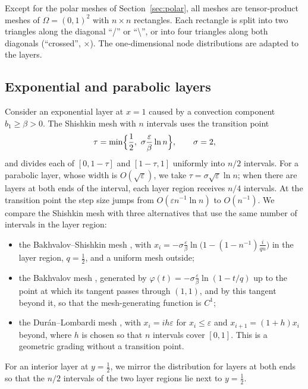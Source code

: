 \documentclass[11pt,a4paper]{article}
\newcommand{\eps}{\varepsilon}
\theoremstyle{remark}
\begin{document}
Except for the polar meshes of Section~\ref{sec:polar}, all meshes are tensor-product meshes of $\Omega=(0,1)^2$ with
$n\times n$ rectangles. Each rectangle is split into two triangles along the diagonal ``/'' or ``\textbackslash'', or
into four triangles along both diagonals (``crossed'', $\times$). The one-dimensional node distributions are adapted
to the layers.

\subsection{Exponential and parabolic layers}

Consider an exponential layer at $x=1$ caused by a convection component $b_1\ge\beta>0$. The Shishkin mesh
\cite{MOS96,RST08} with $n$ intervals uses the transition point
\begin{equation}\label{eq:tau}
  \tau=\min\Bigl\{\frac12,\ \sigma\frac{\eps}{\beta}\ln n\Bigr\},\qquad\sigma=2,
\end{equation}
and divides each of $[0,1-\tau]$ and $[1-\tau,1]$ uniformly into $n/2$ intervals. For a parabolic layer, whose width
is $O(\sqrt\eps)$, we take $\tau=\sigma\sqrt\eps\ln n$; when there are layers at both ends of the interval, each layer
region receives $n/4$ intervals. At the transition point the step size jumps from $O(\eps n^{-1}\ln n)$ to
$O(n^{-1})$. We compare the Shishkin mesh with three alternatives that use the same number of intervals in the layer
region:
\begin{itemize}[leftmargin=*,nosep]
\item the Bakhvalov--Shishkin mesh \cite{Lin10}, with $x_i=-\sigma\frac{\eps}{\beta}\ln\bigl(1-(1-n^{-1})\frac{i}{qn}\bigr)$
  in the layer region, $q=\frac12$, and a uniform mesh outside;
\item the Bakhvalov mesh \cite{Bak69}, generated by $\varphi(t)=-\sigma\frac{\eps}{\beta}\ln(1-t/q)$ up to the point
  at which its tangent passes through $(1,1)$, and by this tangent beyond it, so that the mesh-generating function is
  $C^1$;
\item the Dur\'an--Lombardi mesh \cite{DL06}, with $x_i=ih\eps$ for $x_i\le\eps$ and $x_{i+1}=(1+h)x_i$ beyond, where
  $h$ is chosen so that $n$ intervals cover $[0,1]$. This is a geometric grading without a transition point.
\end{itemize}
For an interior layer at $y=\frac12$, we mirror the distribution for layers at both ends so that the $n/2$ intervals
of the two layer regions lie next to $y=\frac12$.
\end{document}
